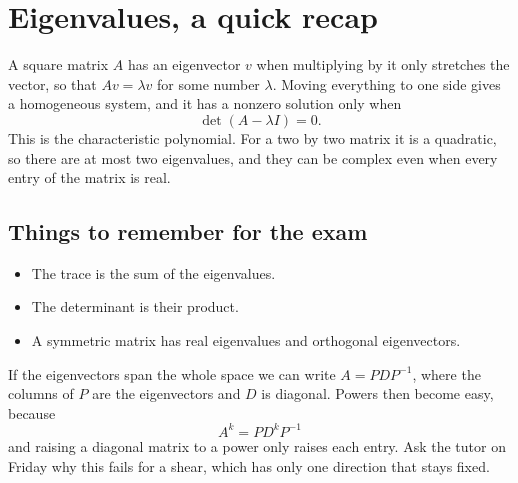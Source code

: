 \documentclass{article}
\begin{document}
\section{Eigenvalues, a quick recap}
A square matrix $A$ has an eigenvector $v$ when multiplying by it only stretches the
vector, so that $Av = \lambda v$ for some number $\lambda$. Moving everything to one side
gives a homogeneous system, and it has a nonzero solution only when
\begin{equation}
  \det(A - \lambda I) = 0 .
\end{equation}
This is the characteristic polynomial. For a two by two matrix it is a quadratic, so
there are at most two eigenvalues, and they can be complex even when every entry of the
matrix is real.

\subsection{Things to remember for the exam}
\begin{itemize}
  \item The trace is the sum of the eigenvalues.
  \item The determinant is their product.
  \item A symmetric matrix has real eigenvalues and orthogonal eigenvectors.
\end{itemize}
If the eigenvectors span the whole space we can write $A = PDP^{-1}$, where the columns
of $P$ are the eigenvectors and $D$ is diagonal. Powers then become easy, because
\begin{equation}
  A^k = P D^k P^{-1}
\end{equation}
and raising a diagonal matrix to a power only raises each entry. Ask the tutor on Friday
why this fails for a shear, which has only one direction that stays fixed.
\end{document}

